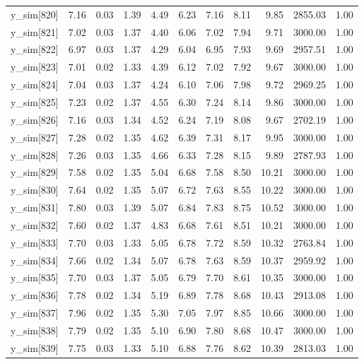 \begin{table}[ht]
\begin{tabular}{rrrrrrrrrrr}
  y\_sim[820] & 7.16 & 0.03 & 1.39 & 4.49 & 6.23 & 7.16 & 8.11 & 9.85 & 2855.03 & 1.00 \\ 
  y\_sim[821] & 7.02 & 0.03 & 1.37 & 4.40 & 6.06 & 7.02 & 7.94 & 9.71 & 3000.00 & 1.00 \\ 
  y\_sim[822] & 6.97 & 0.03 & 1.37 & 4.29 & 6.04 & 6.95 & 7.93 & 9.69 & 2957.51 & 1.00 \\ 
  y\_sim[823] & 7.01 & 0.02 & 1.33 & 4.39 & 6.12 & 7.02 & 7.92 & 9.67 & 3000.00 & 1.00 \\ 
  y\_sim[824] & 7.04 & 0.03 & 1.37 & 4.24 & 6.10 & 7.06 & 7.98 & 9.72 & 2969.25 & 1.00 \\ 
  y\_sim[825] & 7.23 & 0.02 & 1.37 & 4.55 & 6.30 & 7.24 & 8.14 & 9.86 & 3000.00 & 1.00 \\ 
  y\_sim[826] & 7.16 & 0.03 & 1.34 & 4.52 & 6.24 & 7.19 & 8.08 & 9.67 & 2702.19 & 1.00 \\ 
  y\_sim[827] & 7.28 & 0.02 & 1.35 & 4.62 & 6.39 & 7.31 & 8.17 & 9.95 & 3000.00 & 1.00 \\ 
  y\_sim[828] & 7.26 & 0.03 & 1.35 & 4.66 & 6.33 & 7.28 & 8.15 & 9.89 & 2787.93 & 1.00 \\ 
  y\_sim[829] & 7.58 & 0.02 & 1.35 & 5.04 & 6.68 & 7.58 & 8.50 & 10.21 & 3000.00 & 1.00 \\ 
  y\_sim[830] & 7.64 & 0.02 & 1.35 & 5.07 & 6.72 & 7.63 & 8.55 & 10.22 & 3000.00 & 1.00 \\ 
  y\_sim[831] & 7.80 & 0.03 & 1.39 & 5.07 & 6.84 & 7.83 & 8.75 & 10.52 & 3000.00 & 1.00 \\ 
  y\_sim[832] & 7.60 & 0.02 & 1.37 & 4.83 & 6.68 & 7.61 & 8.51 & 10.21 & 3000.00 & 1.00 \\ 
  y\_sim[833] & 7.70 & 0.03 & 1.33 & 5.05 & 6.78 & 7.72 & 8.59 & 10.32 & 2763.84 & 1.00 \\ 
  y\_sim[834] & 7.66 & 0.02 & 1.34 & 5.07 & 6.78 & 7.63 & 8.59 & 10.37 & 2959.92 & 1.00 \\ 
  y\_sim[835] & 7.70 & 0.03 & 1.37 & 5.05 & 6.79 & 7.70 & 8.61 & 10.35 & 3000.00 & 1.00 \\ 
  y\_sim[836] & 7.78 & 0.02 & 1.34 & 5.19 & 6.89 & 7.78 & 8.68 & 10.43 & 2913.08 & 1.00 \\ 
  y\_sim[837] & 7.96 & 0.02 & 1.35 & 5.30 & 7.05 & 7.97 & 8.85 & 10.66 & 3000.00 & 1.00 \\ 
  y\_sim[838] & 7.79 & 0.02 & 1.35 & 5.10 & 6.90 & 7.80 & 8.68 & 10.47 & 3000.00 & 1.00 \\ 
  y\_sim[839] & 7.75 & 0.03 & 1.33 & 5.10 & 6.88 & 7.76 & 8.62 & 10.39 & 2813.03 & 1.00 \\ 

\end{tabular}
\end{table}
